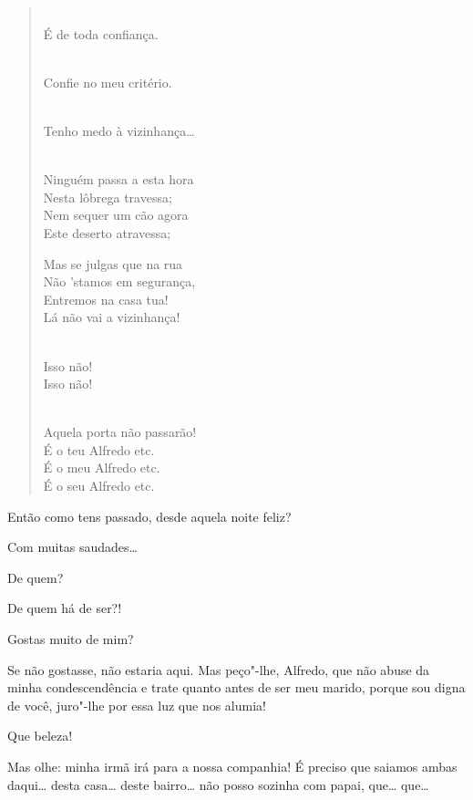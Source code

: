 \begin{linenumbers}
\begin{verse}
\\
É de toda confiança.

\pagebreak

\\
Confie no meu critério.

\\
Tenho medo à vizinhança\ldots{}

\\
Ninguém passa a esta hora\\
Nesta lôbrega travessa;\\
Nem sequer um cão agora\\
Este deserto atravessa;

Mas se julgas que na rua\\
Não 'stamos em segurança,\\
Entremos na casa tua!\\
Lá não vai a vizinhança!

\\
Isso não!\\ 
Isso não!


\\
Aquela porta não passarão!\\
É o teu Alfredo etc.\\
É o meu  Alfredo etc.\\
É o seu Alfredo etc.
\end{verse}

 
Então como tens passado, desde aquela noite feliz?

  Com muitas saudades\ldots{}

 De quem?

 De quem há de ser?!

 Gostas muito de
mim?

 Se não gostasse, não estaria aqui. Mas peço"-lhe,
Alfredo, que não abuse da minha
condescendência e trate quanto antes de ser meu
marido, porque sou digna de você, juro"-lhe por essa
luz que nos alumia!

 Que beleza!

 Mas olhe: minha
irmã irá para a nossa companhia! É
preciso que saiamos ambas daqui\ldots{} desta casa\ldots{} deste
bairro\ldots{} não posso sozinha com papai, que\ldots{} que\ldots{} 


\end{linenumbers}
